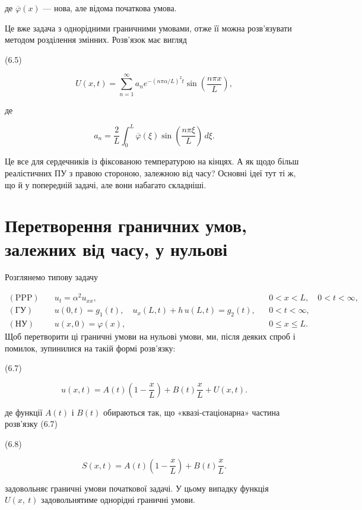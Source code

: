 \documentclass[
  ukrainian,
]{article}
\begin{document}
де \(\overline{\varphi}(x)\) --- нова, але відома початкова умова.

Це вже задача з однорідними граничними умовами, отже її можна
розв'язувати методом розділення змінних. Розв'язок має вигляд

(6.5)

\[
U(x,t)=\sum_{n=1}^{\infty} a_n e^{-(n\pi\alpha/L)^2 t}\sin\!\left(\frac{n\pi x}{L}\right),
\]

де

\[
a_n=\frac{2}{L}\int_0^L \overline{\varphi}(\xi)\sin\!\left(\frac{n\pi \xi}{L}\right)\,d\xi.
\]

Це все для сердечників із фіксованою температурою на кінцях. А як щодо
більш реалістичних ПУ з правою стороною, залежною від часу? Основні ідеї
тут ті ж, що й у попередній задачі, але вони набагато складніші.

\section{Перетворення граничних умов, залежних від часу, у
нульові}\label{ux43fux435ux440ux435ux442ux432ux43eux440ux435ux43dux43dux44f-ux433ux440ux430ux43dux438ux447ux43dux438ux445-ux443ux43cux43eux432-ux437ux430ux43bux435ux436ux43dux438ux445-ux432ux456ux434-ux447ux430ux441ux443-ux443-ux43dux443ux43bux44cux43eux432ux456}

Розглянемо типову задачу

\[
\begin{aligned}
(\text{PPP})\quad & u_t = \alpha^2 u_{xx}, && 0 < x < L,\quad 0 < t < \infty, \\
(\text{ГУ})\quad & u(0,t)=g_1(t),\quad u_x(L,t)+h\,u(L,t)=g_2(t), && 0 < t < \infty, \\
(\text{НУ})\quad & u(x,0)=\varphi(x), && 0 \le x \le L.
\end{aligned}
\] Щоб перетворити ці граничні умови на нульові умови, ми, після деяких
спроб і помилок, зупинилися на такій формі розв'язку:

(6.7)

\[
u(x, t)=A(t)\left(1-\frac{x}{L}\right)+B(t)\frac{x}{L}+U(x, t).
\]

де функції \(A\left(t\right)\) і \(B\left(t\right)\) обираються так, що
«квазі-стаціонарна» частина розв'язку (6.7)

(6.8)

\[
S(x, t)=A(t)\left(1-\frac{x}{L}\right)+B(t)\frac{x}{L}.
\]

задовольняє граничні умови початкової задачі. У цьому випадку функція
\(U\left(x,\ t\right)\) задовольнятиме однорідні граничні умови.
\end{document}
